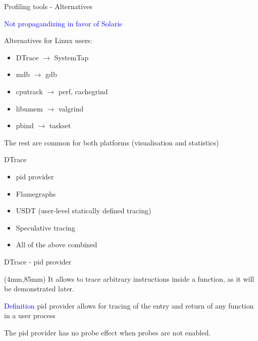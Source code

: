 \documentclass{beamer}
\newenvironment{reference}[2]{%
  \begin{textblock*}{\textwidth}(#1,#2) 
      \tiny\bgroup\color{red!50!black}}{\egroup\end{textblock*}}
\begin{document}
\begin{frame}{Profiling tools - Alternatives}

\textcolor{blue}{Not propagandizing in favor of Solaris}

\vspace{5mm}

Alternatives for Linux users:

\begin{itemize}
\item DTrace $\rightarrow$ SystemTap
\item mdb $\rightarrow$ gdb
\item cputrack $\rightarrow$ perf, cachegrind
\item libumem $\rightarrow$ valgrind
\item pbind $\rightarrow$ taskset
\end{itemize}

The rest are common for both platforms (visualisation and statistics)

\end{frame}

\begin{frame}{DTrace}

\begin{itemize}
\item pid provider
\item Flamegraphs
\item USDT (user-level statically defined tracing)
\item Speculative tracing
\item All of the above combined
\end{itemize}
\end{frame}

\begin{frame}{DTrace - pid provider}
\begin{reference}{4mm}{85mm}
It allows to trace arbitrary instructions inside a function, as it will be
demonstrated later.
\end{reference} 

\textcolor{blue}{Definition} pid provider allows for tracing of the entry and
return of any function in a user process

\vspace{5mm}

The pid provider has no probe effect when probes are not enabled.
\end{frame}
\end{document}
